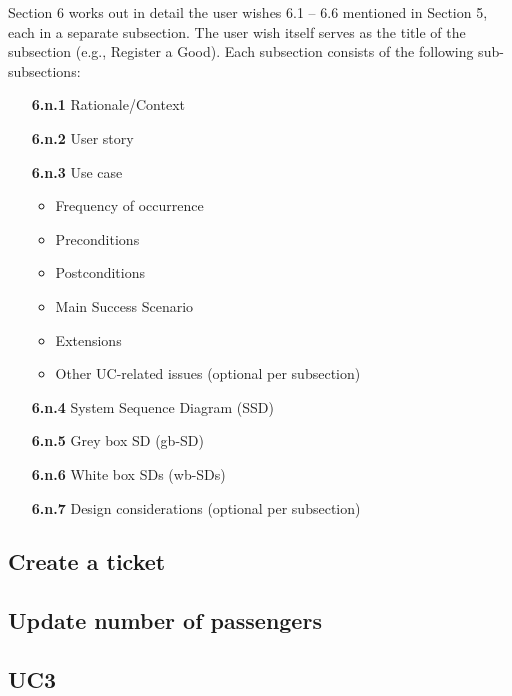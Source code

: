 Section 6 works out in detail the user wishes 6.1 – 6.6 mentioned in Section 5, each in a separate subsection. The
user wish itself serves as the title of the subsection (e.g., Register a Good). Each subsection consists of the
following sub-subsections:
\begin{enumerate}
    \item[\textbf{6.n.1}] Rationale/Context
    \item[\textbf{6.n.2}] User story
    \item[\textbf{6.n.3}] Use case
    \begin{itemize}
        \item Frequency of occurrence
        \item Preconditions
        \item Postconditions
        \item Main Success Scenario
        \item Extensions
        \item Other UC-related issues (optional per subsection)
    \end{itemize}
    \item[\textbf{6.n.4}] System Sequence Diagram (SSD)
    \item[\textbf{6.n.5}] Grey box SD (gb-SD)
    \item[\textbf{6.n.6}] White box SDs (wb-SDs)
    \item[\textbf{6.n.7}] Design considerations (optional per subsection)
\end{enumerate}
\newpage

\subsection{Create a ticket}

\newpage

\subsection{Update number of passengers}

\newpage

\subsection{UC3}

\newpage